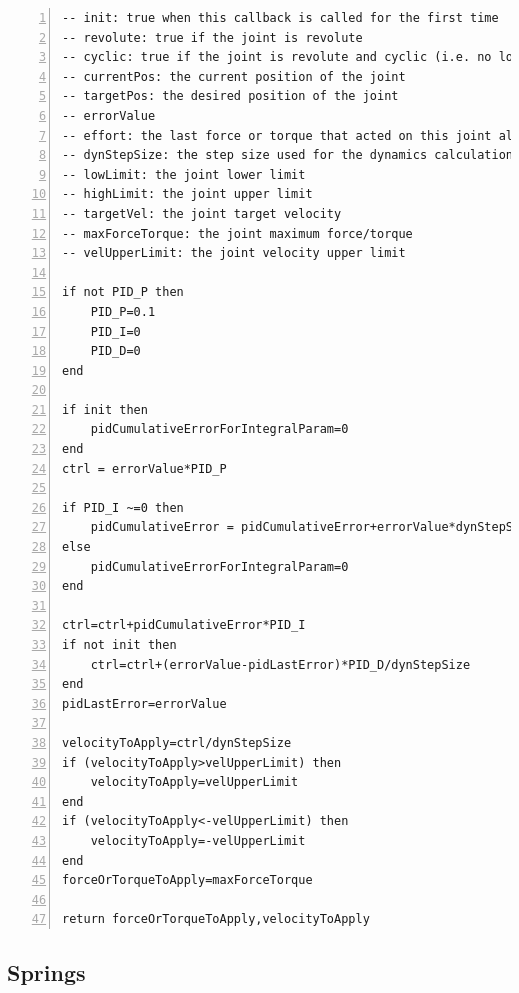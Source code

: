 \begin{lstlisting}[language={[5.0]Lua}, numbers = left, tabsize = 4, frame=single,breaklines, keywordstyle=\color{blue}, float, caption=Control code of the servo, captionpos = b ]
-- init: true when this callback is called for the first time
-- revolute: true if the joint is revolute
-- cyclic: true if the joint is revolute and cyclic (i.e. no lower/upper limits)
-- currentPos: the current position of the joint
-- targetPos: the desired position of the joint
-- errorValue
-- effort: the last force or torque that acted on this joint along/around its axis
-- dynStepSize: the step size used for the dynamics calculations
-- lowLimit: the joint lower limit
-- highLimit: the joint upper limit
-- targetVel: the joint target velocity 
-- maxForceTorque: the joint maximum force/torque
-- velUpperLimit: the joint velocity upper limit

if not PID_P then
    PID_P=0.1
    PID_I=0
    PID_D=0
end

if init then
    pidCumulativeErrorForIntegralParam=0
end
ctrl = errorValue*PID_P

if PID_I ~=0 then
    pidCumulativeError = pidCumulativeError+errorValue*dynStepSize
else
    pidCumulativeErrorForIntegralParam=0
end

ctrl=ctrl+pidCumulativeError*PID_I
if not init then
    ctrl=ctrl+(errorValue-pidLastError)*PID_D/dynStepSize
end
pidLastError=errorValue

velocityToApply=ctrl/dynStepSize
if (velocityToApply>velUpperLimit) then
    velocityToApply=velUpperLimit
end
if (velocityToApply<-velUpperLimit) then
    velocityToApply=-velUpperLimit
end
forceOrTorqueToApply=maxForceTorque

return forceOrTorqueToApply,velocityToApply
\end{lstlisting}

\subsection{Springs}

